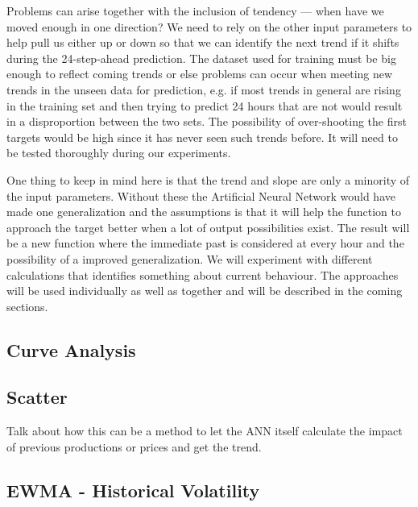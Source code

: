 Problems can arise together with the inclusion of tendency --- when have we moved enough in one direction? We need to rely on the other input parameters to help pull us either up or down so that we can identify the next trend if it shifts during the 24-step-ahead prediction. The dataset used for training must be big enough to reflect coming trends or else problems can occur when meeting new trends in the unseen data for prediction, e.g. if most trends in general are rising in the training set and then trying to predict 24 hours that are not would result in a disproportion between the two sets. The possibility of over-shooting the first targets would be high since it has never seen such trends before. It will need to be tested thoroughly during our experiments. 

One thing to keep in mind here is that the trend and slope are only a minority of the input parameters. Without these the Artificial Neural Network would have made one generalization and the assumptions is that it will help the function to approach the target better when a lot of output possibilities exist. The result will be a new function where the immediate past is considered at every hour and the possibility of a improved generalization. We will experiment with different calculations that identifies something about current behaviour. The approaches will be used individually as well as together and will be described in the coming sections.

\subsection{Curve Analysis}
\label{sec:curveAnalysis}

\subsection{Scatter}
\label{sec:scatterStrategy}
Talk about how this can be a method to let the ANN itself calculate the impact of previous productions or prices and get the trend.

\subsection{EWMA - Historical Volatility}
\label{sec:ewmaVolatility}

